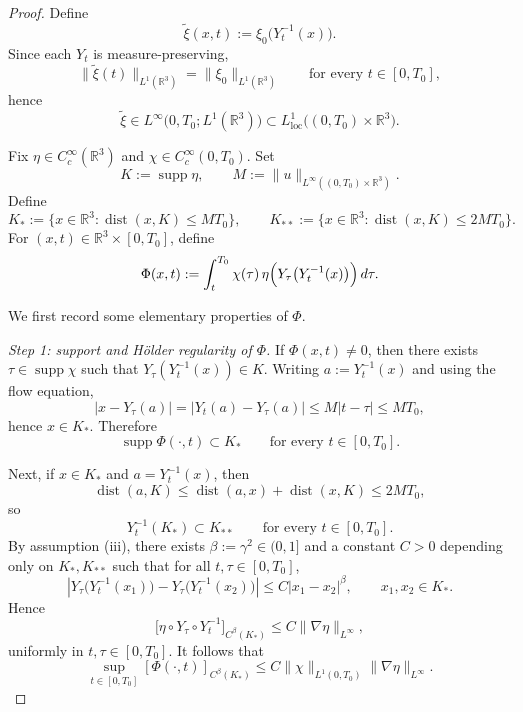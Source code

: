 \documentclass[10pt,a4paper]{amsart}
\begin{document}
\begin{proof}
Define
\[
\widetilde{\xi}(x,t):=\xi_0\bigl(Y_t^{-1}(x)\bigr).
\]
Since each $Y_t$ is measure-preserving,
\[
\|\widetilde{\xi}(t)\|_{L^1(\mathbb R^3)}=\|\xi_0\|_{L^1(\mathbb R^3)}
\qquad\text{for every }t\in[0,T_0],
\]
hence
\[
\widetilde{\xi}\in L^\infty\bigl(0,T_0;L^1(\mathbb R^3)\bigr)
\subset L^1_{\mathrm{loc}}\bigl((0,T_0)\times\mathbb R^3\bigr).
\]

Fix $\eta\in C_c^\infty(\mathbb R^3)$ and $\chi\in C_c^\infty(0,T_0)$. Set
\[
K:=\operatorname{supp}\eta,
\qquad
M:=\|u\|_{L^\infty((0,T_0)\times\mathbb R^3)}.
\]
Define
\[
K_*:=\{x\in\mathbb R^3:\operatorname{dist}(x,K)\le MT_0\},
\qquad
K_{**}:=\{x\in\mathbb R^3:\operatorname{dist}(x,K)\le 2MT_0\}.
\]
For $(x,t)\in\mathbb R^3\times[0,T_0]$, define
\[
\Phi(x,t):=
\int_t^{T_0}\chi(\tau)\,\eta\Bigl(Y_\tau \big(Y_t^{-1}(x)\big)\Bigr)\,d\tau.
\]

We first record some elementary properties of $\Phi$.

\smallskip
\noindent\emph{Step 1: support and H\"older regularity of $\Phi$.}
If $\Phi(x,t)\neq 0$, then there exists $\tau\in \operatorname{supp}\chi$ such that
$Y_\tau(Y_t^{-1}(x))\in K$. Writing $a:=Y_t^{-1}(x)$ and using the flow equation,
\[
|x-Y_\tau(a)|=|Y_t(a)-Y_\tau(a)|
\le M|t-\tau|
\le MT_0,
\]
hence $x\in K_*$. Therefore
\[
\operatorname{supp}\Phi(\cdot,t)\subset K_*
\qquad\text{for every }t\in[0,T_0].
\]

Next, if $x\in K_*$ and $a=Y_t^{-1}(x)$, then
\[
\operatorname{dist}(a,K)\le \operatorname{dist}(a,x)+\operatorname{dist}(x,K)\le 2MT_0,
\]
so
\[
Y_t^{-1}(K_*)\subset K_{**}
\qquad\text{for every }t\in[0,T_0].
\]
By assumption (iii), there exists $\beta:=\gamma^2\in(0,1]$ and a constant $C>0$
depending only on $K_*,K_{**}$ such that for all $t,\tau\in[0,T_0]$,
\[
\left|Y_\tau\big(Y_t^{-1}(x_1)\big)-Y_\tau\big(Y_t^{-1}(x_2)\big)
\right|
\le C |x_1-x_2|^\beta,
\qquad x_1,x_2\in K_*.
\]
Hence
\[
\bigl[\eta\circ Y_\tau\circ Y_t^{-1}\bigr]_{C^\beta(K_*)}
\le C\|\nabla\eta\|_{L^\infty},
\]
uniformly in $t,\tau\in[0,T_0]$. It follows that
\begin{equation}
\label{eq:Phi_holder_appendix}
\sup_{t\in[0,T_0]}[\Phi(\cdot,t)]_{C^\beta(K_*)}
\le C\|\chi\|_{L^1(0,T_0)}\|\nabla\eta\|_{L^\infty}.
\end{equation}




\end{proof}
\end{document}
